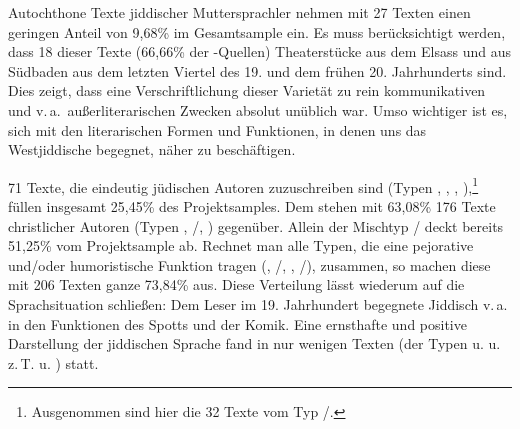 		 \begin{table}
		 \caption{Funktionstypen des späten Westjiddisch}
		 \label{tblFunktionstypen}
		 \end{table}

	 	
\noindent Autochthone Texte jiddischer Muttersprachler nehmen mit 27 Texten einen geringen Anteil von  9,68\% im Gesamtsample ein. Es muss berücksichtigt werden, dass 18 dieser Texte (66,66\% der -Quellen) Theaterstücke aus dem Elsass und aus Südbaden aus dem letzten Viertel des 19. und dem frühen 20. Jahrhunderts sind. Dies zeigt, dass eine Verschriftlichung dieser Varietät zu rein kommunikativen und v.\,a.\, außerliterarischen Zwecken absolut unüblich war. Umso wichtiger ist es, sich mit den literarischen Formen und Funktionen, in denen uns das Westjiddische begegnet, näher zu beschäftigen.  

 71 Texte, die eindeutig jüdischen Autoren zuzuschreiben sind (Typen , , , ),\footnote{Ausgenommen sind hier die 32 Texte vom Typ /.} füllen insgesamt 25,45\% des Projektsamples. Dem stehen mit 63,08\% 176 Texte christlicher Autoren (Typen , /, ) gegenüber. Allein der Mischtyp / deckt bereits 51,25\% vom Projektsample ab. Rechnet man alle Typen, die eine pejorative und/oder humoristische Funktion tragen (, /, , /), zusammen, so machen diese mit 206 Texten ganze 73,84\% aus. Diese Verteilung lässt wiederum auf  die Sprachsituation schließen: Dem Leser im 19. Jahrhundert  begegnete Jiddisch v.\,a.\, in den Funktionen des Spotts und der Komik. Eine ernsthafte und positive Darstellung der jiddischen Sprache fand in nur wenigen Texten (der Typen  u.  u. z.\,T.  u. ) statt. 

